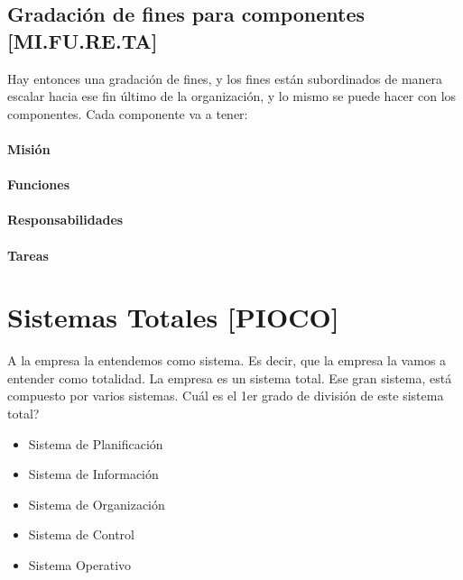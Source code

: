 \hypertarget{gradaciuxf3n-de-fines-para-componentes-mi.fu.re.ta}{%
\subsection{Gradación de fines para componentes
{[}MI.FU.RE.TA{]}}\label{gradaciuxf3n-de-fines-para-componentes-mi.fu.re.ta}}

Hay entonces una gradación de fines, y los fines están subordinados de
manera escalar hacia ese fin último de la organización, y lo mismo se
puede hacer con los componentes. Cada componente va a tener: 
\paragraph{Misión}
\paragraph{Funciones}
\paragraph{Responsabilidades}
\paragraph{Tareas}


\hypertarget{sistemas-totales-pioco}{%
\section{Sistemas Totales {[}PIOCO{]}}\label{sistemas-totales-pioco}}

A la empresa la entendemos como sistema. Es decir, que la empresa la
vamos a entender como totalidad. La empresa es un sistema total. Ese
gran sistema, está compuesto por varios sistemas. Cuál es el 1er grado
de división de este sistema total?

\begin{itemize}
  \setlength\itemsep{-1em}
\item
  Sistema de Planificación
\item
  Sistema de Información
\item
  Sistema de Organización
\item
  Sistema de Control
\item
  Sistema Operativo
\end{itemize}

